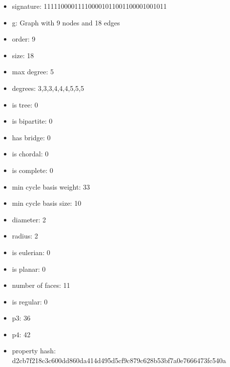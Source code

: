 \newpage
\begin{figure}
\end{figure}
\begin{itemize}
\item signature: 111110000111100001011001100001001011
\item g: Graph with 9 nodes and 18 edges
\item order: 9
\item size: 18
\item max degree: 5
\item degrees: 3,3,3,4,4,4,5,5,5
\item is tree: 0
\item is bipartite: 0
\item has bridge: 0
\item is chordal: 0
\item is complete: 0
\item min cycle basis weight: 33
\item min cycle basis size: 10
\item diameter: 2
\item radius: 2
\item is eulerian: 0
\item is planar: 0
\item number of faces: 11
\item is regular: 0
\item p3: 36
\item p4: 42
\item property hash: d2cb7f218c3c600dd860da414d495d5cf9c879c628b53bf7a0e7666473fc540a
\end{itemize}
